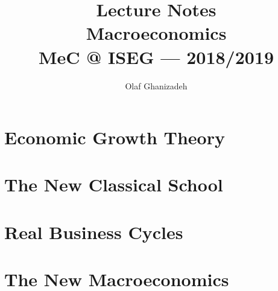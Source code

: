\documentclass[12pt]{report}
\begin{document}


\title{
Lecture Notes \\
\large Macroeconomics \\
MeC @ ISEG --- 2018/2019
}
\author{Olaf Ghanizadeh}




\maketitle


\tableofcontents

\newpage

\chapter{Economic Growth Theory}

\chapter{The New Classical School}

\chapter{Real Business Cycles}

\newpage

\newpage
\chapter{The New Macroeconomics}



\printbibliography






\end{document}

